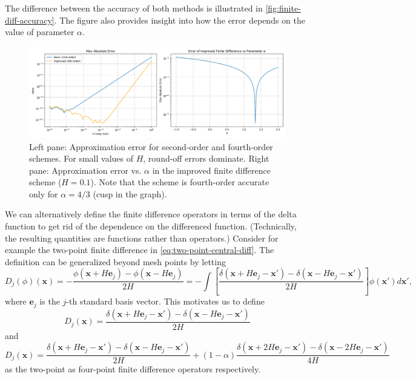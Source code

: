 The difference between the accuracy of both methods is illustrated in \autoref{fig:finite-diff-accuracy}.
The figure also provides insight into how the error depends on the value of parameter $\alpha$.
\begin{figure}[htp]
    \centering
    \includegraphics[scale=0.43]{img/finite-diff/finite-difference.png}
    \caption{Left pane: Approximation error for second-order and fourth-order schemes.
        For small values of $H$, round-off errors dominate.
        Right pane: Approximation error vs. $\alpha$ in the improved finite difference scheme ($H = 0.1$).
        Note that the scheme is fourth-order accurate only for $\alpha = 4/3$ (cusp in the graph).}
    \label{fig:finite-diff-accuracy}
\end{figure}

We can alternatively define the finite difference operators in terms of the delta function to get rid of the dependence on the differenced function. (Technically, the resulting quantities are functions rather than operators.)
Consider for example the two-point finite difference in \autoref{eq:two-point-central-diff}.
The definition can be generalized beyond mesh points by letting
\begin{equation*}
    D_j(\phi)(\mathbf{x}) = -\frac{\phi(\mathbf{x} + H \mathbf{e}_j)-\phi (\mathbf{x} - H \mathbf{e}_j)}{2H} = -\int \left[ \frac{\delta(\mathbf{x} + H\mathbf{e}_j - \mathbf{x}') - \delta(\mathbf{x} - H\mathbf{e}_j - \mathbf{x}')}{2H} \right]\phi(\mathbf{x}')d\mathbf{x}',
\end{equation*}
where $\mathbf{e}_j$ is the $j$-th standard basis vector.
This motivates us to define
\begin{equation}\label{eq:two-point-central-diff}
    D_j(\mathbf{x}) = \frac{\delta(\mathbf{x} + H\mathbf{e}_j - \mathbf{x}') - \delta(\mathbf{x} - H\mathbf{e}_j - \mathbf{x}')}{2H}
\end{equation}
and
\begin{equation}\label{eq:four-point-central-diff}
    D_j(\mathbf{x}) = \frac{\delta(\mathbf{x} + H\mathbf{e}_j - \mathbf{x}') - \delta(\mathbf{x} - H\mathbf{e}_j - \mathbf{x}')}{2H} + (1-\alpha)\frac{\delta(\mathbf{x} + 2H\mathbf{e}_j - \mathbf{x}') - \delta(\mathbf{x} - 2H\mathbf{e}_j - \mathbf{x}')}{4H}
\end{equation}
as the two-point as four-point finite difference operators respectively.

